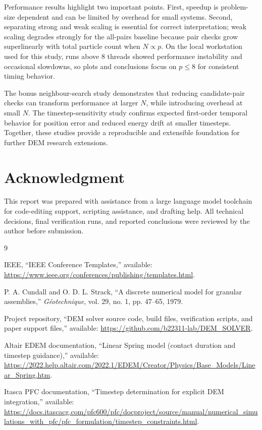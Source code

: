 \documentclass[conference]{IEEEtran}
\newcommand{\projectrepo}{\url{https://github.com/b22311-lab/DEM_SOLVER}}
\begin{document}
Performance results highlight two important points. First, speedup is problem-size dependent and can be limited by overhead for small systems. Second, separating strong and weak scaling is essential for correct interpretation; weak scaling degrades strongly for the all-pairs baseline because pair checks grow superlinearly with total particle count when $N\propto p$.
On the local workstation used for this study, runs above 8 threads showed performance instability and occasional slowdowns, so plots and conclusions focus on $p\leq 8$ for consistent timing behavior.

The bonus neighbour-search study demonstrates that reducing candidate-pair checks can transform performance at larger $N$, while introducing overhead at small $N$. The timestep-sensitivity study confirms expected first-order temporal behavior for position error and reduced energy drift at smaller timesteps. Together, these studies provide a reproducible and extensible foundation for further DEM research extensions.

\section*{Acknowledgment}
This report was prepared with assistance from a large language model toolchain for code-editing support, scripting assistance, and drafting help. All technical decisions, final verification runs, and reported conclusions were reviewed by the author before submission.

\begin{thebibliography}{9}

IEEE, ``IEEE Conference Templates,'' available: \url{https://www.ieee.org/conferences/publishing/templates.html}.

P. A. Cundall and O. D. L. Strack, ``A discrete numerical model for granular assemblies,'' \emph{G\'eotechnique}, vol. 29, no. 1, pp. 47--65, 1979.

Project repository, ``DEM solver source code, build files, verification scripts, and paper support files,'' available: \projectrepo.

Altair EDEM documentation, ``Linear Spring model (contact duration and timestep guidance),'' available: \url{https://2022.help.altair.com/2022.1/EDEM/Creator/Physics/Base_Models/Linear_Spring.htm}.

Itasca PFC documentation, ``Timestep determination for explicit DEM integration,'' available: \url{https://docs.itascacg.com/pfc600/pfc/docproject/source/manual/numerical_simulations_with_pfc/pfc_formulation/timestep_constraints.html}.

\end{thebibliography}
\end{document}
